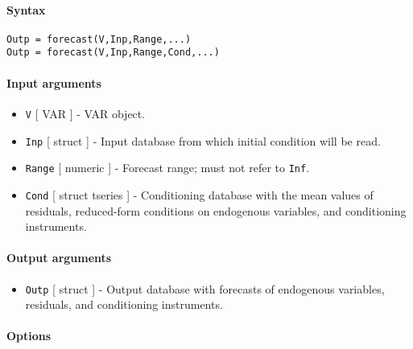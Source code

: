 


	\paragraph{Syntax}\label{syntax}

\begin{verbatim}
Outp = forecast(V,Inp,Range,...)
Outp = forecast(V,Inp,Range,Cond,...)
\end{verbatim}

\paragraph{Input arguments}\label{input-arguments}

\begin{itemize}
\item
  \texttt{V} {[} VAR {]} - VAR object.
\item
  \texttt{Inp} {[} struct {]} - Input database from which initial
  condition will be read.
\item
  \texttt{Range} {[} numeric {]} - Forecast range; must not refer to
  \texttt{Inf}.
\item
  \texttt{Cond} {[} struct \textbar{} tseries {]} - Conditioning
  database with the mean values of residuals, reduced-form conditions on
  endogenous variables, and conditioning instruments.
\end{itemize}

\paragraph{Output arguments}\label{output-arguments}

\begin{itemize}
\itemsep1pt\parskip0pt
\item
  \texttt{Outp} {[} struct {]} - Output database with forecasts of
  endogenous variables, residuals, and conditioning instruments.
\end{itemize}

\paragraph{Options}\label{options}

